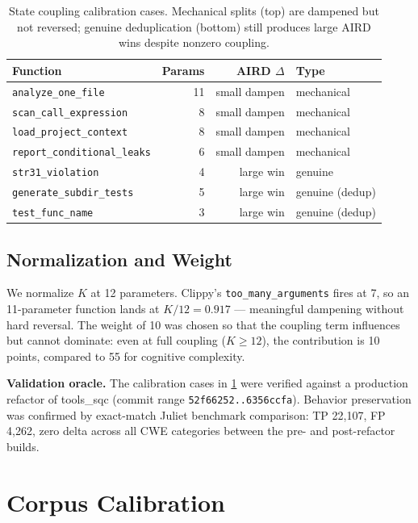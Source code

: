 \documentclass[10pt,twocolumn,letterpaper]{article}
\begin{document}
\begin{table}[t]
\centering
\footnotesize
\begin{tabular}{@{}lrrl@{}}
\toprule
\textbf{Function} & \textbf{Params} & \textbf{AIRD $\Delta$} & \textbf{Type} \\
\midrule
\texttt{analyze\_one\_file}       & 11 & small dampen & mechanical \\
\texttt{scan\_call\_expression}   & 8  & small dampen & mechanical \\
\texttt{load\_project\_context}   & 8  & small dampen & mechanical \\
\texttt{report\_conditional\_leaks} & 6 & small dampen & mechanical \\
\midrule
\texttt{str31\_violation}         & 4  & large win & genuine \\
\texttt{generate\_subdir\_tests}  & 5  & large win & genuine (dedup) \\
\texttt{test\_func\_name}         & 3  & large win & genuine (dedup) \\
\bottomrule
\end{tabular}
\caption{State coupling calibration cases.  Mechanical splits (top) are
dampened but not reversed; genuine deduplication (bottom) still produces
large AIRD wins despite nonzero coupling.}
\label{tab:coupling-cases}
\end{table}

\subsection{Normalization and Weight}

We normalize $K$ at 12 parameters.  Clippy's \texttt{too\_many\_arguments}
fires at 7, so an 11-parameter function lands at $K/12 = 0.917$ ---
meaningful dampening without hard reversal.  The weight of 10 was chosen
so that the coupling term influences but cannot dominate: even at full
coupling ($K \geq 12$), the contribution is 10 points, compared to 55
for cognitive complexity.

\textbf{Validation oracle.}  The calibration cases in \cref{tab:coupling-cases}
were verified against a production refactor of tools\_sqc (commit range
\texttt{52f66252..6356ccfa}).  Behavior preservation was confirmed by
exact-match Juliet benchmark comparison: TP 22,107, FP 4,262, zero delta
across all CWE categories between the pre- and post-refactor builds.

\section{Corpus Calibration}
\label{sec:calibration}
\end{document}

